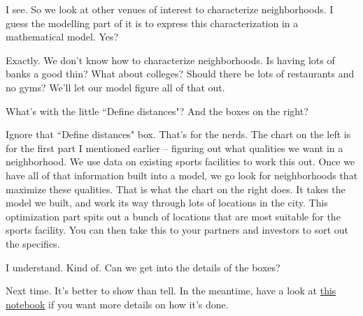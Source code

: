 {\color{blue} I see. So we look at other venues of interest to characterize neighborhoods. I guess the modelling part of it is to express this characterization in a mathematical model. Yes?}

Exactly. We don't know how to characterize neighborhoods. Is having lots of banks a good thin? What about colleges? Should there be lots of restaurants and no gyms? We'll let our model figure all of that out. 

{\color{blue} What's with the little ``Define distances"? And the boxes on the right?}

Ignore that ``Define distances" box. That's for the nerds. The chart on the left is for the first part I mentioned earlier -- figuring out what qualities we want in a neighborhood. We use data on existing sports facilities to work this out. Once we have all of that information built into a model, we go look for neighborhoods that maximize these qualities. That is what the chart on the right does. It takes the model we built, and work its way through lots of locations in the city. This optimization part spits out a bunch of locations that are most suitable for the sports facility. You can then take this to your partners and investors to sort out the specifics. 

{\color{blue} I understand. Kind of. Can we get into the details of the boxes?}


Next time. It's better to show than tell. In the meantime, have a look at \href{https://github.com/saba-vadarevu/IBM-dataScience-Capstone/blob/master/final/intro_data.ipynb}{this notebook} if you want more details on how it's done.
